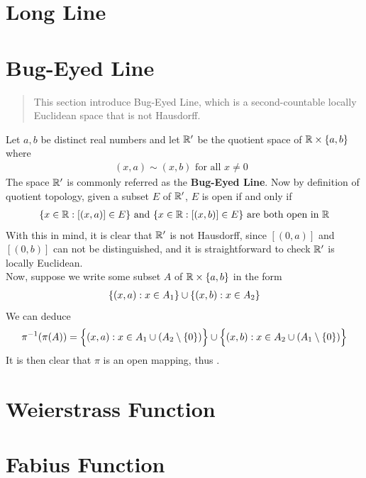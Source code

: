 \documentclass{report}
\begin{document}
\section{Long Line}
\label{Long Line}
\section{Bug-Eyed Line}
\label{Bug-Eyed Line}
\begin{abstract}
This section introduce Bug-Eyed Line, which is a second-countable locally Euclidean space that is not Hausdorff.
\end{abstract}
\begin{mdframed}
Let $a,b$ be distinct real numbers and let $\mathbb{R}'$ be the quotient space of $\mathbb{R}\times \{ a,b \}$ where 
\begin{align*}
  (x,a)\sim (x,b)\text{ for all $x\neq 0$ }
\end{align*}
The space $\mathbb{R}'$ is commonly referred as the  \textbf{Bug-Eyed Line}. Now by definition of quotient topology, given a subset $E$ of  $\mathbb{R}'$, $E $ is open if and only if 
\begin{align*}
  \{ x\in\mathbb{R}:[(x,a)]\in E \}\text{ and }\{ x\in\mathbb{R}:[(x,b)]\in E \}\text{ are both open in }\mathbb{R}
\end{align*}
With this in mind, it is clear that $\mathbb{R}'$ is not Hausdorff, since  $[(0,a)]$ and $[(0,b)]$ can not be distinguished, and it is straightforward to check $\mathbb{R}'$ is locally Euclidean.\\


Now, suppose we write some subset $A$ of $\mathbb{R}\times \{ a,b \}$ in the form  
\begin{align*}
\{ (x,a):x \in A_1 \}\cup  \{ (x,b):x \in A_2 \}
\end{align*}
We can deduce
\begin{align*}
\pi^{-1}(\pi (A))=\Big\{ (x,a): x\in A_1 \cup (A_2\setminus \{ 0 \}) \Big\}\cup  \Big\{ (x,b):x \in A_2 \cup  (A_1\setminus \{ 0 \}) \Big\}
\end{align*}
It is then clear that $\pi$ is an open mapping, thus .
\end{mdframed}

\section{Weierstrass Function}
\section{Fabius Function}
\end{document}
